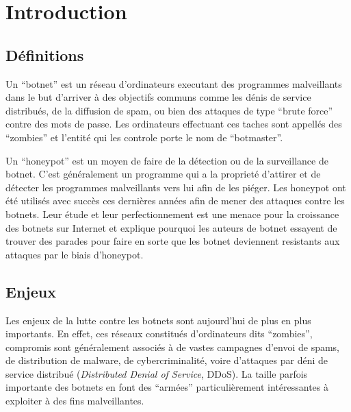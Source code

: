 \section{Introduction}

\subsection{Définitions}

Un ``botnet'' est un réseau d'ordinateurs executant des programmes malveillants
dans le but d'arriver à des objectifs communs comme les dénis de service distribués,
de la diffusion de spam, ou bien des attaques de type ``brute force'' contre
des mots de passe. Les ordinateurs effectuant ces taches sont appellés des ``zombies''
et l'entité qui les controle porte le nom de ``botmaster''.

Un ``honeypot'' est un moyen de faire de la détection ou de la
surveillance de botnet. C'est généralement un programme qui a la proprieté
d'attirer et de détecter les programmes malveillants vers lui afin de les piéger.
Les honeypot ont été utilisés avec succès ces dernières années afin
de mener des attaques contre les botnets. Leur étude et leur perfectionnement
est une menace pour la croissance des botnets sur Internet et explique
pourquoi les auteurs de botnet essayent de trouver des parades pour faire
en sorte que les botnet deviennent resistants aux attaques par le biais d'honeypot.

\subsection{Enjeux}

Les enjeux de la lutte contre les botnets sont aujourd'hui de plus en plus
importants. En effet, ces réseaux constitués d'ordinateurs dits ``zombies'',
compromis sont généralement associés
à de vastes campagnes d'envoi de spams, de distribution de malware, de
cybercriminalité, voire d'attaques par déni de service distribué
(\textit{Distributed Denial of Service}, DDoS).  La taille parfois importante
des botnets en font des ``armées'' particulièrement intéressantes à exploiter à
des fins malveil\-lantes.

